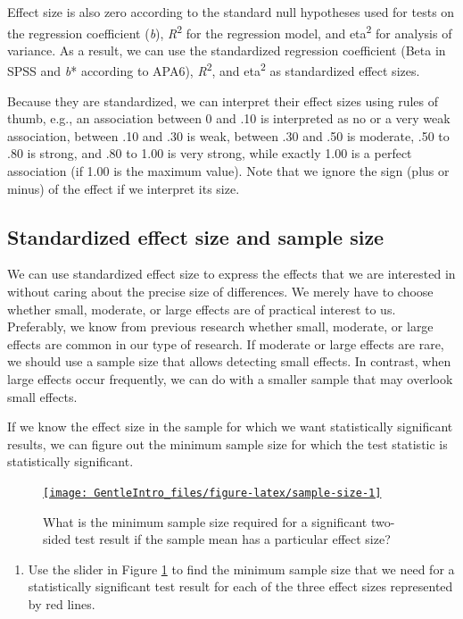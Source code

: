 \documentclass[a4paper]{book}
\providecommand{\tightlist}{%
  \setlength{\itemsep}{0pt}\setlength{\parskip}{0pt}}
\theoremstyle{definition}
\theoremstyle{definition}
\theoremstyle{definition}
\theoremstyle{remark}
\begin{document}
Effect size is also zero according to the standard null hypotheses used
for tests on the regression coefficient (\emph{b}),
\emph{R}\textsuperscript{2} for the regression model, and
eta\textsuperscript{2} for analysis of variance. As a result, we can use
the standardized regression coefficient (Beta in SPSS and \emph{b}*
according to APA6), \emph{R}\textsuperscript{2}, and
eta\textsuperscript{2} as standardized effect sizes.

Because they are standardized, we can interpret their effect sizes using
rules of thumb, e.g., an association between 0 and .10 is interpreted as
no or a very weak association, between .10 and .30 is weak, between .30
and .50 is moderate, .50 to .80 is strong, and .80 to 1.00 is very
strong, while exactly 1.00 is a perfect association (if 1.00 is the
maximum value). Note that we ignore the sign (plus or minus) of the
effect if we interpret its size.

\subsection{Standardized effect size and sample
size}\label{standardized-effect-size-and-sample-size}

We can use standardized effect size to express the effects that we are
interested in without caring about the precise size of differences. We
merely have to choose whether small, moderate, or large effects are of
practical interest to us. Preferably, we know from previous research
whether small, moderate, or large effects are common in our type of
research. If moderate or large effects are rare, we should use a sample
size that allows detecting small effects. In contrast, when large
effects occur frequently, we can do with a smaller sample that may
overlook small effects.

If we know the effect size in the sample for which we want statistically
significant results, we can figure out the minimum sample size for which
the test statistic is statistically significant.

\begin{figure}[H]
\href{http://82.196.4.233:3838/apps/sample-size/}{\texttt{[image: GentleIntro\_files/figure-latex/sample-size-1]} }\caption{What is the minimum sample size required for a significant two-sided test result if the sample mean has a particular effect size?}\label{fig:sample-size}
\end{figure}

\begin{enumerate}
\def\labelenumi{\arabic{enumi}.}
\tightlist
\item
  Use the slider in Figure \ref{fig:sample-size} to find the minimum
  sample size that we need for a statistically significant test result
  for each of the three effect sizes represented by red lines.
\end{enumerate}
\end{document}
